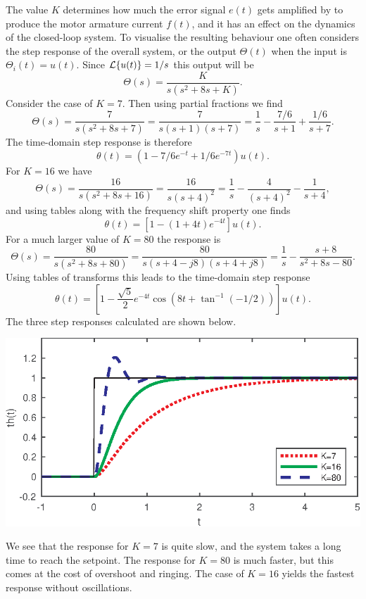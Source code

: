 \documentclass[10pt]{beamer}
\begin{document}
The value $K$ determines how much the error signal $e(t)$ gets amplified by to produce the motor armature current $f(t)$, and it has an effect on the dynamics of the closed-loop system.  To visualise the resulting behaviour one often considers the step response of the overall system, or the output $\Theta(t)$ when the input is $\Theta_i(t) = u(t)$.   Since ${\cal L} \{ u(t) \} = 1/s$ this output will be
\begin{equation*}
  \Theta(s) = \frac{K}{s(s^2 + 8s + K)}.
\end{equation*}
Consider the case of $K=7$.  Then using partial fractions we find
\begin{equation*}
  \Theta(s) = \frac{7}{s(s^2 + 8s + 7)} = \frac{7}{s(s+1)(s+7)}
  = \frac{1}{s} - \frac{7/6}{s+1} + \frac{1/6}{s+7}.
\end{equation*}
The time-domain step response is therefore 
\begin{equation*}
  \theta(t) = (1 - 7/6 e^{-t} + 1/6 e^{-7t}) u(t).
\end{equation*}
For $K=16$ we have
\begin{equation*}
  \Theta(s) = \frac{16}{s(s^2+8s+16)} = \frac{16}{s(s+4)^2} = \frac{1}{s} - \frac{4}{(s+4)^2} - \frac{1}{s+4},
\end{equation*}
and using tables along with the frequency shift property one finds
\begin{equation*}
  \theta(t) = \left[ 1 - (1+4t) e^{-4t} \right] u(t).
\end{equation*}
For a much larger value of $K=80$ the response is
\begin{equation*}
  \Theta(s) = \frac{80}{s(s^2 + 8s + 80)} = \frac{80}{s(s+4-j8)(s+4+j8)}
  = \frac{1}{s} - \frac{s+8}{s^2+8s-80}.
\end{equation*}
Using tables of transforms this leads to the time-domain step response
\begin{equation*}
  \theta(t) = \left[ 1 - \frac{\sqrt{5}}{2} e^{-4t} \cos(8 t + \tan^{-1}(-1/2)) \right] u(t).
\end{equation*}
The three step responses calculated are shown below.
\begin{center}
  \includegraphics{stepresp2control}
\end{center}
We see that the response for $K=7$ is quite slow, and the system takes a long time to reach the setpoint.  The response for $K=80$ is much faster, but this comes at the cost of overshoot and ringing.  The case of $K=16$ yields the fastest response without oscillations.
\end{document}

